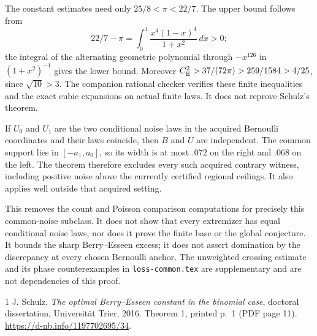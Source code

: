 \documentclass[11pt,a4paper]{article}
\newcommand{\CE}{C_{\rm E}}
\begin{document}
The constant estimates need only $25/8<\pi<22/7$. The upper bound follows
from
\[
 22/7-\pi=\int_0^1\frac{x^4(1-x)^4}{1+x^2}\,dx>0;
\]
the integral of the alternating geometric polynomial through $-x^{126}$
in $(1+x^2)^{-1}$ gives the lower bound. Moreover
$\CE^2>37/(72\pi)>259/1584>4/25$, since $\sqrt{10}>3$.
The companion rational checker verifies these finite inequalities and
the exact cubic expansions on actual finite laws. It does not reprove
Schulz's theorem.

If $U_0$ and $U_1$ are the two conditional noise laws in the acquired
Bernoulli coordinates and their laws coincide, then $B$ and $U$ are
independent. The common support lies in $[-a_1,a_0]$, so its width is
at most $.072$ on the right and $.068$ on the left. The theorem therefore
excludes every such acquired contrary witness, including positive noise
above the currently certified regional ceilings. It also applies well
outside that acquired setting.

This removes the count and Poisson comparison computations for precisely
this common-noise subclass. It does not show that every extremizer has
equal conditional noise laws, nor does it prove the finite base or the
global conjecture. It bounds the sharp Berry--Esseen excess; it does not
assert domination by the discrepancy at every chosen Bernoulli anchor.
The unweighted crossing estimate and its phase counterexamples in
\texttt{loss-common.tex} are supplementary and are not dependencies of
this proof.

\begin{thebibliography}{1}
J. Schulz, \emph{The optimal Berry--Esseen constant in the binomial case},
doctoral dissertation, Universit\"at Trier, 2016.
Theorem 1, printed p.~1 (PDF page 11).
\url{https://d-nb.info/1197702695/34}.
\end{thebibliography}
\end{document}
